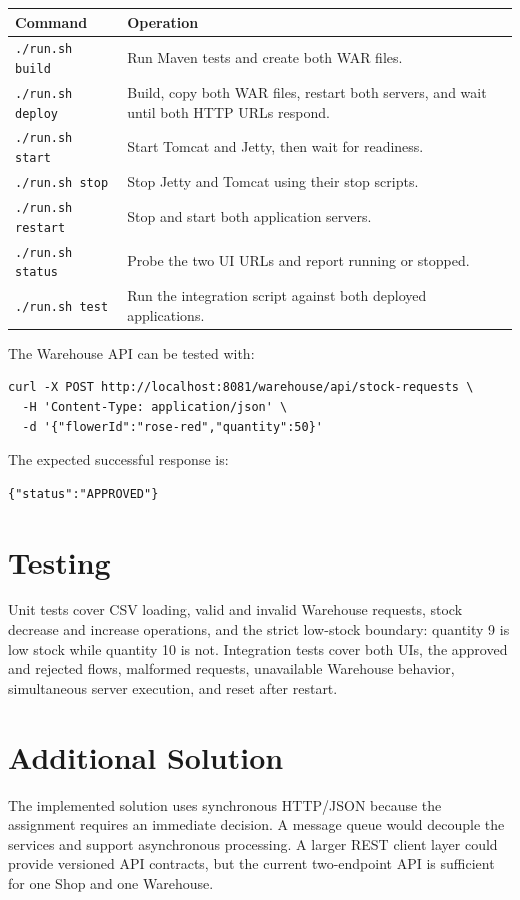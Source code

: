 \documentclass[12pt,a4paper]{article}
\begin{document}
\begin{longtable}{p{}p{}}
\toprule
\textbf{Command} & \textbf{Operation}\\
\midrule
\texttt{./run.sh build} & Run Maven tests and create both WAR files.\\
\texttt{./run.sh deploy} & Build, copy both WAR files, restart both servers,
and wait until both HTTP URLs respond.\\
\texttt{./run.sh start} & Start Tomcat and Jetty, then wait for readiness.\\
\texttt{./run.sh stop} & Stop Jetty and Tomcat using their stop scripts.\\
\texttt{./run.sh restart} & Stop and start both application servers.\\
\texttt{./run.sh status} & Probe the two UI URLs and report running or stopped.\\
\texttt{./run.sh test} & Run the integration script against both deployed
applications.\\
\bottomrule
\end{longtable}

The Warehouse API can be tested with:

\begin{Verbatim}
curl -X POST http://localhost:8081/warehouse/api/stock-requests \
  -H 'Content-Type: application/json' \
  -d '{"flowerId":"rose-red","quantity":50}'
\end{Verbatim}

The expected successful response is:

\begin{Verbatim}
{"status":"APPROVED"}
\end{Verbatim}

\section{Testing}

Unit tests cover CSV loading, valid and invalid Warehouse requests, stock
decrease and increase operations, and the strict low-stock boundary: quantity
9 is low stock while quantity 10 is not. Integration tests cover both
UIs, the approved and rejected flows, malformed requests, unavailable
Warehouse behavior, simultaneous server execution, and reset after restart.

\section{Additional Solution}

The implemented solution uses synchronous HTTP/JSON because the assignment
requires an immediate decision. A message queue would decouple the services
and support asynchronous processing. A larger REST client layer could provide versioned API contracts,
but the current two-endpoint API is sufficient for one Shop and one
Warehouse.
\end{document}
